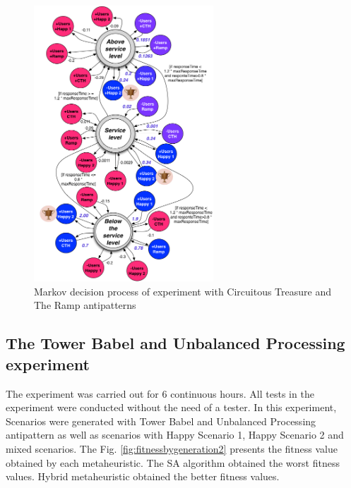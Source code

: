 \begin{figure}[h]
\centering
\includegraphics[width=0.6\textwidth]{./images/mdpexperiment.png}
\caption{Markov decision process of experiment with Circuitous Treasure and The Ramp antipatterns}
\label{fig:mdpexperiment1}

\end{figure}

\FloatBarrier
\subsection{The Tower Babel  and Unbalanced Processing experiment}

The experiment was carried out for 6 continuous hours. All tests in the experiment were conducted without the need of a tester. In this experiment, Scenarios were generated with Tower Babel and Unbalanced Processing antipattern as well as scenarios with Happy Scenario 1, Happy Scenario 2 and mixed scenarios. The Fig. \ref{fig:fitnessbygeneration2}  presents the fitness value obtained by each metaheuristic. The SA algorithm obtained the worst fitness values. Hybrid metaheuristic obtained the better fitness values.


